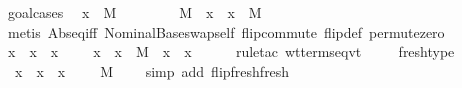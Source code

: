 \begin{isabellebody}
\isamarkupfalse%
\ goal{\isacharunderscore}cases\isanewline
{}\isamarkupfalse%
\ {\isacharparenleft}{}\ x{\isacharprime}\ {\isasymsigma}\ M{\isacharprime}\ {\isasymtau}{\isacharparenright}\ \isanewline
\ \ \isamarkupfalse%
\ \isamarkupfalse%
\ {}{\isacharcolon}\ {\isachardoublequoteopen}M\ {\isacharequal}\ {\isacharparenleft}x{\isacharprime}\ {\isasymleftrightarrow}\ x{\isacharparenright}\ {\isasymbullet}\ M{\isacharprime}{\isachardoublequoteclose}\isanewline
\ \ \isamarkupfalse%
\ {\isacharparenleft}metis\ Abs{}{\isacharunderscore}eq{\isacharunderscore}iff{\isacharprime}{\isacharparenleft}{}{\isacharparenright}\ Nominal{}{\isacharunderscore}Base{\isachardot}swap{\isacharunderscore}self\ flip{\isacharunderscore}commute\ flip{\isacharunderscore}def\ permute{\isacharunderscore}zero{\isacharparenright}\isanewline
\ \ \isamarkupfalse%
\ {}\ \isamarkupfalse%
\ {\isachardoublequoteopen}{\isacharparenleft}{\isacharparenleft}x{\isacharprime}\ {\isasymleftrightarrow}\ x{\isacharparenright}\ {\isasymbullet}\ {\isacharparenleft}{\isacharparenleft}x{\isacharprime}{\isacharcomma}\ {\isasymsigma}{\isacharparenright}\ {\isacharhash}\ {\isasymGamma}{\isacharparenright}{\isacharparenright}\ {\isasymturnstile}\ {\isacharparenleft}x{\isacharprime}\ {\isasymleftrightarrow}\ x{\isacharparenright}\ {\isasymbullet}\ M{\isacharprime}\ {\isacharcolon}\ {\isacharparenleft}x{\isacharprime}\ {\isasymleftrightarrow}\ x{\isacharparenright}\ {\isasymbullet}\ {\isasymtau}{\isachardoublequoteclose}\isanewline
\ \ \isamarkupfalse%
\ {\isacharparenleft}rule{\isacharunderscore}tac\ wt{\isacharunderscore}terms{\isachardot}eqvt{\isacharparenright}\isanewline
\ \ \isamarkupfalse%
\ {}\ fresh{\isacharunderscore}type\ \isamarkupfalse%
\ {}{\isacharcolon}\ {\isachardoublequoteopen}{\isacharparenleft}{\isacharparenleft}x{\isacharprime}\ {\isasymleftrightarrow}\ x{\isacharparenright}\ {\isasymbullet}\ {\isacharparenleft}{\isacharparenleft}x{\isacharprime}{\isacharcomma}\ {\isasymsigma}{\isacharparenright}\ {\isacharhash}\ {\isasymGamma}{\isacharparenright}{\isacharparenright}\ {\isasymturnstile}\ M\ {\isacharcolon}\ {\isasymtau}{\isachardoublequoteclose}\ \isamarkupfalse%
\ {\isacharparenleft}simp\ add{\isacharcolon}\ flip{\isacharunderscore}fresh{\isacharunderscore}fresh{\isacharparenright}\isanewline
\isanewline
\ \ \isamarkupfalse%

\end{isabellebody}

